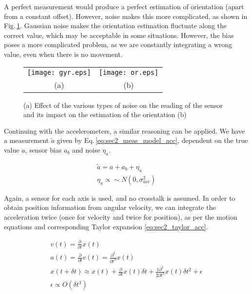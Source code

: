 A perfect measurement would produce a perfect estimation of orientation (apart from a constant offset). However, noise makes this more complicated, as shown in Fig.\,\ref{fig:sec2_gyr_noise_int}. Gaussian noise makes the orientation estimation fluctuate along the correct value, which may be acceptable in some situations. However, the bias poses a more complicated problem, as we are constantly integrating a wrong value, even when there is no movement.

\begin{figure}[H]
	\centering
		\begin{tabular}{cc}
		   \texttt{[image: gyr.eps]} &
		   \texttt{[image: or.eps]} \\
		   (a) & (b) \\
		\end{tabular}
	\caption[Effect of noise on IMU]{(a) Effect of the various types of noise on the reading of the sensor and its impact on the estimation of the orientation (b)}   
    \label{fig:sec2_gyr_noise_int}
\end{figure}

Continuing with the accelerometers, a similar reasoning can be applied. We have a measurement $\tilde{a}$ given by Eq.\,\eqref{eq:sec2_meas_model_acc}, dependent on the true value $a$, sensor bias $a_b$ and noise $\eta_a$.

\begin{equation}
    \label{eq:sec2_meas_model_acc}
    \begin{split}
        \tilde{a} = a + a_b + \eta_a \\
        \eta_a \propto \sim N\left( 0, \sigma_{acc}^2 \right)
    \end{split}
\end{equation}

Again, a sensor for each axis is used, and no crosstalk is assumed. In order to obtain position information from angular velocity, we can integrate the acceleration twice (once for velocity and twice for position), as per the motion equations and corresponding Taylor expansion \eqref{eq:sec2_taylor_acc}.

\begin{equation}
    \label{eq:sec2_taylor_acc}
    \begin{split}
        v(t) = \frac{\partial}{\partial t} x(t) \\
        a(t) = \frac{\partial}{\partial t} v(t) = \frac{\partial^2}{\partial t^2} x(t)\\
        x(t+\delta t) \approx x(t) + \frac{\partial}{\partial t} x(t) \delta t + \frac{1 \partial^2}{2 \partial t^2} x(t) \delta t^2+ \epsilon\\
        \epsilon \propto O(\delta t^3)
    \end{split}
\end{equation}

